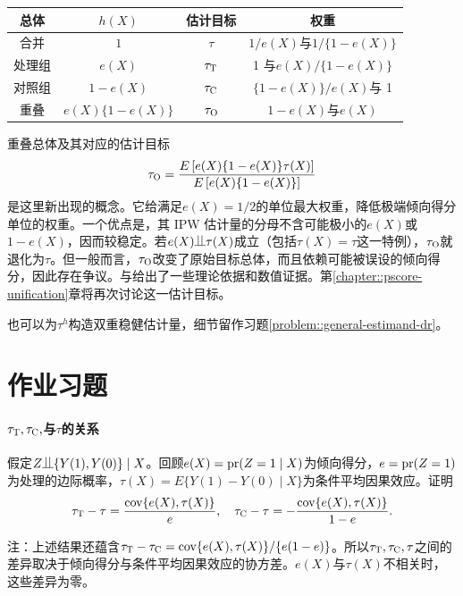 \begin{tabular}{cccc}
\hline 
 总体 & $h(X)$ & 估计目标 & 权重 \\ \hline 
合并 & $1$ & $\tau$ & $1/e(X)$与$1/\{  1-e(X) \} $  \\
处理组 & $e(X)$ & $\tau_\textsc{T}$ & 1 与$ e(X)/\{  1-e(X) \}$ \\
对照组 & $1-e(X)$ & $\tau_\textsc{C}$ & $\{  1-e(X) \} /e(X) $与 1\\
重叠 & $e(X)\{  1-e(X) \} $ &$\tau_\textsc{O}$  &  $ 1-e(X)$与$e(X) $ \\
\hline 
\end{tabular}


重叠总体及其对应的估计目标
$$
\tau_\textsc{O} = \frac{   E\left[ e(X)\{  1-e(X) \}   \tau(X) \right] }{   E\left[ e(X)\{  1-e(X) \}    \right] }
$$
是这里新出现的概念。它给满足$e(X) = 1/2$的单位最大权重，降低极端倾向得分单位的权重。一个优点是，其 IPW 估计量的分母不含可能极小的$e(X)$或$1-e(X) $，因而较稳定。若$ e(X) \ind  \tau(X) $成立（包括$\tau(X) = \tau$这一特例），$\tau_\textsc{O} $就退化为$\tau$。但一般而言，$\tau_\textsc{O} $改变了原始目标总体，而且依赖可能被误设的倾向得分，因此存在争议。\citet{li2018balancing}与\citet{li2019addressing}给出了一些理论依据和数值证据。第\ref{chapter::pscore-unification}章将再次讨论这一估计目标。 


也可以为$\tau^h$构造双重稳健估计量，细节留作习题\ref{problem::general-estimand-dr}。 
 
 
 \section{作业习题}
 
 
\paragraph{$\tau_\textsc{T},  \tau_\textsc{C}, $与$\tau$的关系}\label{hw::difference-tau-T-tau} 
 
假定$Z\ind \{Y(1), Y(0)\} \mid X$。回顾$e(X) = \textup{pr}(Z=1\mid X)$为倾向得分，$e = \textup{pr}(Z=1)$为处理的边际概率，$\tau(X) = E\{  Y(1)-Y(0) \mid X \}$为条件平均因果效应。证明
$$
\tau_\textsc{T} - \tau = \frac{  \textup{cov}\{ e(X) ,  \tau(X)  \} }{e},\quad
\tau_\textsc{C} - \tau = - \frac{  \textup{cov}\{ e(X) ,  \tau(X)  \} }{1-e}.
$$ 


注：上述结果还蕴含$ \tau_\textsc{T} -  \tau_\textsc{C} =  \textup{cov}\{ e(X) ,  \tau(X)  \} / \{  e(1-e) \}$。所以$ \tau_\textsc{T} ,   \tau_\textsc{C} , \tau$之间的差异取决于倾向得分与条件平均因果效应的协方差。$e(X) $与$  \tau(X) $不相关时，这些差异为零。 
 
